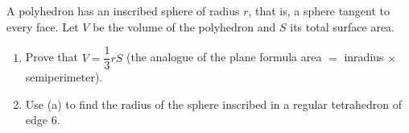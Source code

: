 A polyhedron has an inscribed sphere of radius $r$, that is, a sphere tangent to every face. Let $V$ be the volume of the polyhedron and $S$ its total surface area.
\begin{enumerate}
\item[(a)] Prove that $V=\dfrac{1}{3}rS$ (the analogue of the plane formula area $=$ inradius $\times$ semiperimeter).
\item[(b)] Use (a) to find the radius of the sphere inscribed in a regular tetrahedron of edge $6$.
\end{enumerate}
